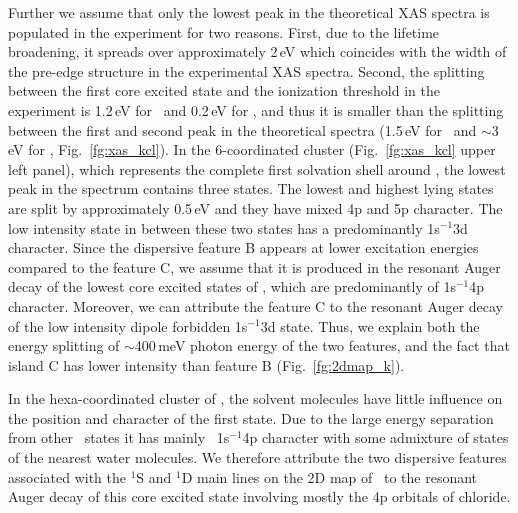 Further we assume that only the lowest peak in the theoretical XAS spectra is populated in the experiment for two reasons. First, due to the lifetime broadening, it spreads over approximately 2\,eV which coincides with the width of the pre-edge structure in the experimental XAS spectra. Second, the splitting between the first core excited state and the ionization threshold in the experiment is 1.2\,eV for \ki~and 0.2\,eV for \cli, and thus it is smaller than the splitting between the first and second peak in the theoretical spectra (1.5\,eV for \ki~and $\sim$3\,eV for \cli, Fig.\ \ref{fg:xas_kcl}). In the 6-coordinated cluster (Fig.\ \ref{fg:xas_kcl} upper left panel), which represents the complete first solvation shell around \ki, the lowest peak in the spectrum contains three states. The lowest and highest lying states are split by approximately 0.5\,eV and they have mixed 4p and 5p character. The low intensity state in between these two states has a predominantly 1s$^{-1}$3d character. Since the dispersive feature B appears at lower excitation energies compared to the feature C, we assume that it is produced in the resonant Auger decay of the lowest core excited states of \ki, which are predominantly of 1s$^{-1}$4p character. Moreover, we can attribute the feature C to the resonant Auger decay of the low intensity dipole forbidden 1s$^{-1}$3d state. Thus, we explain both the energy splitting of $\sim$400\,meV photon energy of the two features, and the fact that island C has lower intensity than feature B (Fig.\ \ref{fg:2dmap_k}).


In the hexa-coordinated cluster of \cli, the solvent molecules have little influence on the position and character of the first state. Due to the large energy separation from other \cli~states it has mainly \cli~1s$^{-1}$4p character with some admixture of states of the nearest water molecules. We therefore attribute the two dispersive features associated with the $^1$S and $^1$D main lines on the 2D map of \cli~to the resonant Auger decay of this core excited state involving mostly the 4p orbitals of chloride.


